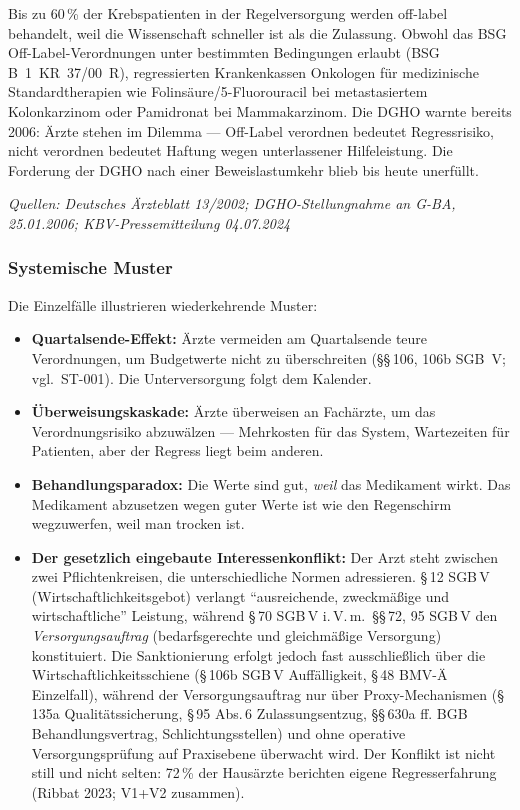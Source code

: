 \documentclass{umbruch-position}
\begin{document}
\begin{infobox}
Bis zu 60\,\% der Krebspatienten in der Regelversorgung werden off-label behandelt, weil die Wissenschaft schneller ist als die Zulassung. Obwohl das BSG Off-Label-Verordnungen unter bestimmten Bedingungen erlaubt (BSG B~1~KR~37/00~R), regressierten Krankenkassen Onkologen für medizinische Standardtherapien wie Folinsäure/5-Fluorouracil bei metastasiertem Kolonkarzinom oder Pamidronat bei Mammakarzinom. Die DGHO warnte bereits 2006: Ärzte stehen im Dilemma — Off-Label verordnen bedeutet Regressrisiko, nicht verordnen bedeutet Haftung wegen unterlassener Hilfeleistung. Die Forderung der DGHO nach einer Beweislastumkehr blieb bis heute unerfüllt.

\textit{Quellen: Deutsches Ärzteblatt 13/2002; DGHO-Stellungnahme an G-BA, 25.01.2006; KBV-Pressemitteilung 04.07.2024}
\end{infobox}

\subsubsection{Systemische Muster}

Die Einzelfälle illustrieren wiederkehrende Muster:

\begin{itemize}[nosep]
  \item \textbf{Quartalsende-Effekt:} Ärzte vermeiden am Quartalsende teure Verordnungen, um Budgetwerte nicht zu überschreiten (\S\S\,106, 106b SGB~V; vgl.\ ST-001). Die Unterversorgung folgt dem Kalender.
  \item \textbf{Überweisungskaskade:} Ärzte überweisen an Fachärzte, um das Verordnungsrisiko abzuwälzen — Mehrkosten für das System, Wartezeiten für Patienten, aber der Regress liegt beim anderen.
  \item \textbf{Behandlungsparadox:} Die Werte sind gut, \textit{weil} das Medikament wirkt. Das Medikament abzusetzen wegen guter Werte ist wie den Regenschirm wegzuwerfen, weil man trocken ist.
  \item \textbf{Der gesetzlich eingebaute Interessenkonflikt:} Der Arzt steht zwischen zwei Pflichtenkreisen, die unterschiedliche Normen adressieren. \S\,12 SGB\,V (Wirtschaftlichkeitsgebot) verlangt ``ausreichende, zweckmäßige und wirtschaftliche'' Leistung, während \S\,70 SGB\,V i.\,V.\,m.\ \S\S\,72, 95 SGB\,V den \emph{Versorgungsauftrag} (bedarfsgerechte und gleichmäßige Versorgung) konstituiert. Die Sanktionierung erfolgt jedoch fast ausschließlich über die Wirtschaftlichkeitsschiene (\S\,106b SGB\,V Auffälligkeit, \S\,48 BMV-Ä Einzelfall), während der Versorgungsauftrag nur über Proxy-Mechanismen (\S\,135a Qualitätssicherung, \S\,95 Abs.\,6 Zulassungsentzug, \S\S\,630a ff. BGB Behandlungsvertrag, Schlichtungsstellen) und ohne operative Versorgungsprüfung auf Praxisebene überwacht wird. Der Konflikt ist nicht still und nicht selten: 72\,\% der Hausärzte berichten eigene Regresserfahrung (Ribbat 2023; V1+V2 zusammen).
\end{itemize}
\end{document}
